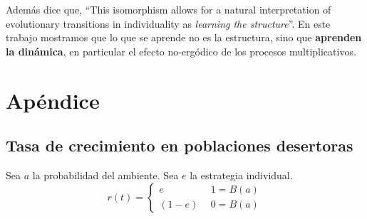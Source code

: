 \documentclass[a4paper,10pt]{article}
\begin{document}
Además \cite{czegel2019-bayesianEvolution} dice que, ``This isomorphism allows for a natural interpretation of evolutionary transitions in individuality as \emph{learning the structure}''.
En este trabajo mostramos que lo que se aprende no es la estructura, sino que \textbf{aprenden la dinámica}, en particular el efecto no-ergódico de los procesos multiplicativos.



% 
{\footnotesize


}

\section{Apéndice}



\subsection{Tasa de crecimiento en poblaciones desertoras}

Sea $a$ la probabilidad del ambiente.
Sea $e$ la estrategia individual.
\begin{equation}
r(t) =
\begin{cases}
 e & \ \  1=B(a) \\
 (1-e) & \ \  0=B(a)
\end{cases}
\end{equation}
\end{document}
